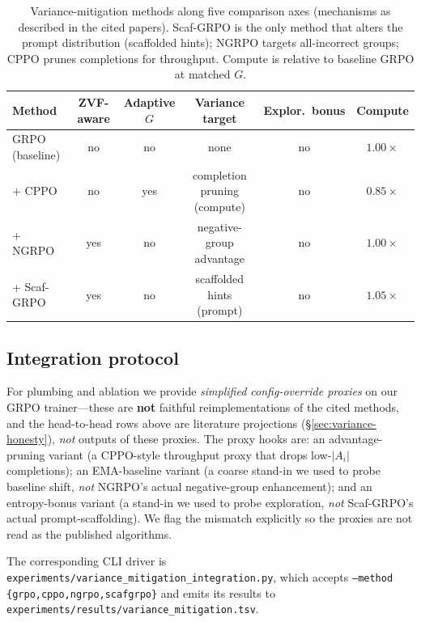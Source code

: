 \begin{table}[t]
  \centering
  \small
  \setlength{\tabcolsep}{4pt}
  \begin{tabular}{lccccc}
    \toprule
    \textbf{Method} &
    \textbf{ZVF-aware} &
    \textbf{Adaptive $G$} &
    \textbf{Variance target} &
    \textbf{Explor.\ bonus} &
    \textbf{Compute} \\
    \midrule
    GRPO (baseline)      & no  & no  & none                    & no  & $1.00\times$ \\
    + CPPO~\cite{lin2025cppo}       & no  & yes & completion pruning (compute) & no  & $0.85\times$ \\
    + NGRPO~\cite{nan2025ngrpo}     & yes & no  & negative-group advantage & no  & $1.00\times$ \\
    + Scaf-GRPO~\cite{zhang2025scaffgrpo} & yes & no  & scaffolded hints (prompt) & no  & $1.05\times$ \\
    \bottomrule
  \end{tabular}
  \caption{Variance-mitigation methods along five comparison axes (mechanisms as
  described in the cited papers). Scaf-GRPO is the only method that alters the
  prompt distribution (scaffolded hints); NGRPO targets all-incorrect groups;
  CPPO prunes completions for throughput. Compute is relative to baseline GRPO at
  matched $G$.}
  \label{tab:variance-axes}
\end{table}

\subsection{Integration protocol}
\label{sec:variance-integration}

For plumbing and ablation we provide \emph{simplified config-override proxies}
on our GRPO trainer---these are \textbf{not} faithful reimplementations of the
cited methods, and the head-to-head rows above are literature projections
(\S\ref{sec:variance-honesty}), \emph{not} outputs of these proxies. The proxy
hooks are: an advantage-pruning variant (a CPPO-style throughput proxy that drops
low-$|A_i|$ completions); an EMA-baseline variant (a coarse stand-in we used to
probe baseline shift, \emph{not} NGRPO's actual negative-group enhancement); and
an entropy-bonus variant (a stand-in we used to probe exploration, \emph{not}
Scaf-GRPO's actual prompt-scaffolding). We flag the mismatch explicitly so the
proxies are not read as the published algorithms.

The corresponding CLI driver is
\texttt{experiments/variance\_mitigation\_integration.py}, which
accepts \texttt{--method \{grpo,cppo,ngrpo,scafgrpo\}} and
emits its results to
\texttt{experiments/results/variance\_mitigation.tsv}.

